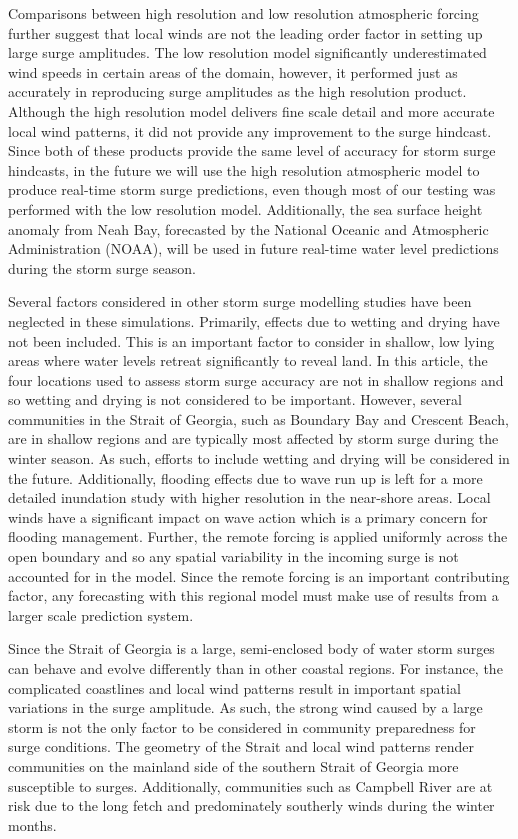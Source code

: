 \documentclass[letterpaper]{tATO2e}
\begin{document}
Comparisons between high resolution and low resolution atmospheric forcing further suggest that local winds are not the leading order factor in setting up large surge amplitudes. The low resolution model significantly underestimated wind speeds in certain areas of the domain, however, it performed just as accurately in reproducing surge amplitudes as the high resolution product.  Although the high resolution model delivers fine scale detail and more accurate local wind patterns, it did not provide any improvement to the surge hindcast. Since both of these products provide the same level of accuracy for storm surge hindcasts, in the future we will use the high resolution atmospheric model to produce real-time storm surge predictions, even though most of our testing was performed with the low resolution model. Additionally, the sea surface height anomaly from Neah Bay, forecasted by the National Oceanic and Atmospheric Administration (NOAA), will be used in future real-time water level predictions during the storm surge season. 

Several factors considered in other storm surge modelling studies have been neglected in these simulations. Primarily, effects due to wetting and drying have not been included. This is an important factor to consider in shallow, low lying areas where water levels retreat significantly to reveal land. In this article, the four locations used to assess storm surge accuracy are not in shallow regions and so wetting and drying is not considered to be important. However, several communities in the Strait of Georgia, such as Boundary Bay and Crescent Beach, are in shallow regions and are typically most affected by storm surge during the winter season. As such, efforts to include wetting and drying will be considered in the future. Additionally, flooding effects due to wave run up is left for a more detailed inundation study with higher resolution in the near-shore areas. Local winds have a significant impact on wave action which is a primary concern for flooding management. Further, the remote forcing is applied uniformly across the open boundary and so any spatial variability in the incoming surge is not accounted for in the model. Since the remote forcing is an important contributing factor, any forecasting with this regional model must make use of results from a larger scale prediction system. 

Since the Strait of Georgia is a large, semi-enclosed body of water storm surges can behave and evolve differently than in other coastal regions. For instance, the complicated coastlines and local wind patterns result in important spatial variations in the surge amplitude. As such, the strong wind caused by a large storm is not the only factor to be considered in community preparedness for surge conditions. The geometry of the Strait and local wind patterns render communities on the mainland side of the southern Strait of Georgia more susceptible to surges. Additionally, communities such as Campbell River are at risk due to the long fetch and predominately southerly winds during the winter months.
\end{document}

